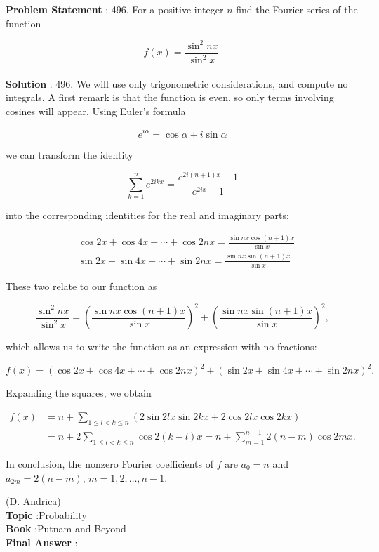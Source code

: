 \documentclass[10pt]{article}
\begin{document}
\textbf{Problem Statement} :
496. For a positive integer $n$ find the Fourier series of the function

$$
f(x)=\frac{\sin ^{2} n x}{\sin ^{2} x} .
$$
\\
\textbf{Solution} :
496. We will use only trigonometric considerations, and compute no integrals. A first remark is that the function is even, so only terms involving cosines will appear. Using Euler's formula

$$
e^{i \alpha}=\cos \alpha+i \sin \alpha
$$

we can transform the identity

$$
\sum_{k=1}^{n} e^{2 i k x}=\frac{e^{2 i(n+1) x}-1}{e^{2 i x}-1}
$$

into the corresponding identities for the real and imaginary parts:

$$
\begin{aligned}
&\cos 2 x+\cos 4 x+\cdots+\cos 2 n x=\frac{\sin n x \cos (n+1) x}{\sin x} \\
&\sin 2 x+\sin 4 x+\cdots+\sin 2 n x=\frac{\sin n x \sin (n+1) x}{\sin x}
\end{aligned}
$$

These two relate to our function as

$$
\frac{\sin ^{2} n x}{\sin ^{2} x}=\left(\frac{\sin n x \cos (n+1) x}{\sin x}\right)^{2}+\left(\frac{\sin n x \sin (n+1) x}{\sin x}\right)^{2},
$$

which allows us to write the function as an expression with no fractions:

$$
f(x)=(\cos 2 x+\cos 4 x+\cdots+\cos 2 n x)^{2}+(\sin 2 x+\sin 4 x+\cdots+\sin 2 n x)^{2} .
$$

Expanding the squares, we obtain

$$
\begin{aligned}
f(x) &=n+\sum_{1 \leq l<k \leq n}(2 \sin 2 l x \sin 2 k x+2 \cos 2 l x \cos 2 k x) \\
&=n+2 \sum_{1 \leq l<k \leq n} \cos 2(k-l) x=n+\sum_{m=1}^{n-1} 2(n-m) \cos 2 m x .
\end{aligned}
$$

In conclusion, the nonzero Fourier coefficients of $f$ are $a_{0}=n$ and $a_{2 m}=2(n-m)$, $m=1,2, \ldots, n-1$.

(D. Andrica)
\\
\textbf{Topic} :Probability\\
\textbf{Book} :Putnam and Beyond\\
\textbf{Final Answer} :\\
\end{document}
